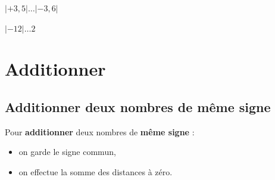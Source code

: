 \documentclass[a4paper]{book}
\begin{document}
\begin{exemple}
\begin{minipage}{0.24\linewidth}
            \vspace{2cm}
        \end{minipage}
        \hfill\vline\hfill
        \begin{minipage}{0.24\linewidth}
            $|+3,5| \ldots |-3,6|$

            \vspace{2cm}
        \end{minipage}
        \hfill\vline\hfill
        \begin{minipage}{0.24\linewidth}
            $|-12| \ldots 2$

            \vspace{2cm}
        \end{minipage}

    \end{exemple}


\section{Additionner}
\subsection{Additionner deux nombres de même signe}
    
    \begin{definition}[Addition]
        Pour \textbf{additionner} deux nombres de \textbf{même signe} :
        \begin{itemize}
            \item on garde le signe commun,
            \item on effectue la somme des distances à zéro.
        \end{itemize}
    \end{definition}
\end{document}
